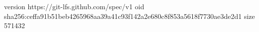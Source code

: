 version https://git-lfs.github.com/spec/v1
oid sha256:ceffa91b51beb4265968aa39a41c93f142a2e680c8f853a5618f7730ae3de2d1
size 571432
